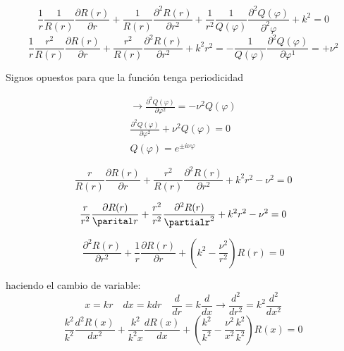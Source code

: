 \documentclass{article}
\begin{document}
\begin{equation}
    \frac{1}{r}\frac{1}{R(r)}\frac{\partial R(r)}{\partial r} + \frac{1}{R(r)}\frac{\partial^2R(r)}{\partial r^2} + \frac{1}{r^2}\frac{1}{Q(\varphi)}\frac{\partial^2Q(\varphi)}{\partial^2\varphi} + k^2 = 0
\end{equation}
\begin{equation}
    \frac{1}{r} \frac{r^2}{R(r)}\frac{\partial R(r)}{\partial r} + \frac{r^2}{R(r)}\frac{\partial^2 R(r)}{\partial r^2} + k^2 r^2 = - \frac{1}{Q(\varphi)}\frac{\partial^2 Q(\varphi)}{\partial \varphi^1} = + \nu^2
\end{equation}

Signos opuestos para que la función  tenga periodicidad

\begin{equation}
    \begin{gathered}
     \to \frac{\partial^2 Q(\varphi)}{\partial \varphi^2} = -\nu^2 Q(\varphi) \\
    \frac{\partial^2 Q(\varphi)}{\partial \varphi^2} + \nu^2 Q(\varphi) = 0\\
    Q(\varphi) = e^{\pm i\nu\varphi}
    \end{gathered}
\end{equation}

\begin{equation}
\frac{r}{R(r)}\frac{\partial R(r)}{\partial r} + \frac{r^2}{R(r)}\frac{\partial^2 R(r)}{\partial r^2} + k^2r^2 - \nu^2 = 0    
\end{equation}

\begin{equation}
    \frac{r}{r^2}\frac{\partial R(r)}{\parital r}  + \frac{r^2}{r^2}\frac{\partial^2R(r)}{\partialr^2} + k^2 r^2 -\nu^2 = 0
\end{equation}

\begin{equation}
    \frac{\partial^2 R(r)}{\partial r^2} + \frac{1}{r} \frac{\partial R(r)}{\partial r}  + \left(k^2 - \frac{\nu^2}{r^2} \right)R(r) = 0
\end{equation}

haciendo el cambio de variable:
\begin{equation}
    x = kr \quad dx = k dr \quad \frac{d}{dr} = k\frac{d}{dx} \to \frac{d^2}{dr^2} = k^2 \frac{d^2}{dx^2}
\end{equation}
\begin{equation}
    \frac{k^2}{k^2}\frac{d^2R(x)}{dx^2} + \frac{k^2}{k^2 x}\frac{dR(x)}{dx} + \left( \frac{k^2}{k^2}- \frac{\nu^2}{x^2} \frac{k^2}{k^2}  \right)R(x) = 0
\end{equation}
\end{document}
